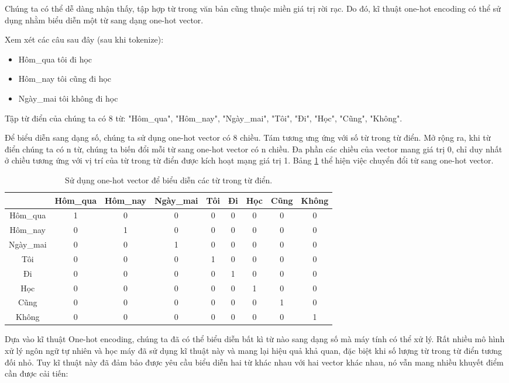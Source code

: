 Chúng ta có thể dễ dàng nhận thấy, tập hợp từ trong văn bản cũng thuộc miền giá trị rời rạc. Do đó, kĩ thuật one-hot encoding có thể sử dụng nhằm biểu diễn một từ sang dạng one-hot vector.

Xem xét các câu sau đây (sau khi tokenize):
\begin{itemize}
    \item Hôm\_qua tôi đi học
    \item Hôm\_nay tôi cũng đi học
    \item Ngày\_mai tôi không đi học
\end{itemize}

Tập từ điển của chúng ta có 8 từ: "Hôm\_qua", "Hôm\_nay", "Ngày\_mai", "Tôi", "Đi", "Học", "Cũng", "Không".

Để biểu diễn sang dạng số, chúng ta sử dụng one-hot vector có 8 chiều. Tám tương ưng ứng với số từ trong từ điển. Mở rộng ra, khi từ điển chúng ta có n từ, chúng ta biến đổi mỗi từ sang one-hot vector có n chiều. Đa phần các chiều của vector mang giá trị 0, chỉ duy nhất ở chiều tương ứng với vị trí của từ trong từ điển được kích hoạt mạng giá trị 1. Bảng \ref{table:one-hot-vector-from-dict} thể hiện việc chuyển đổi từ sang one-hot vector.

\begin{table}[h!]
    \centering
    \begin{tabular}{ |c|c|c|c|c|c|c|c|c| }
    \hline
         & Hôm\_qua & Hôm\_nay & Ngày\_mai & Tôi & Đi & Học & Cũng & Không \\
    \hline
        Hôm\_qua & 1 & 0 & 0 & 0 & 0 & 0 & 0 & 0 \\
        Hôm\_nay & 0 & 1 & 0 & 0 & 0 & 0 & 0 & 0\\
        Ngày\_mai & 0 & 0 & 1 & 0 & 0 & 0 & 0 & 0\\
        Tôi & 0 & 0 & 0 & 1 & 0 & 0 & 0 & 0\\
        Đi & 0 & 0 & 0 & 0 & 1 & 0 & 0 & 0\\
        Học & 0 & 0 & 0 & 0 & 0 & 1 & 0 & 0\\
        Cũng & 0 & 0 & 0 & 0 & 0 & 0 & 1 & 0\\
        Không & 0 & 0 & 0 & 0 & 0 & 0 & 0 & 1 \\
    \hline
    \end{tabular}
    \caption{Sử dụng one-hot vector để biểu diễn các từ trong từ điển.}
    \label{table:one-hot-vector-from-dict}
\end{table}

Dựa vào kĩ thuật One-hot encoding, chúng ta đã có thể biểu diễn bất kì từ nào sang dạng số mà máy tính có thể xử lý. Rất nhiều mô hình xử lý ngôn ngữ tự nhiên và học máy đã sử dụng kĩ thuật này và mang lại hiệu quả khả quan, đặc biệt khi số lượng từ trong từ điển tương đối nhỏ. Tuy kĩ thuật này đã đảm bảo được yêu cầu biểu diễn hai từ khác nhau với hai vector khác nhau, nó vẫn mang nhiều khuyết điểm cần được cải tiến:

